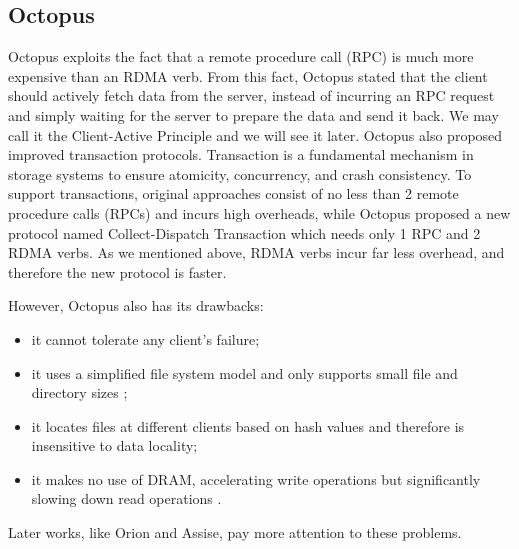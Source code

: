 \begin{survey}
\section{Octopus}
Octopus exploits the fact that a remote procedure call (RPC) is much more expensive than an RDMA verb. From this fact, Octopus stated that the client should actively fetch data from the server, instead of incurring an RPC request and simply waiting for the server to prepare the data and send it back. We may call it the Client-Active Principle and we will see it later. Octopus also proposed improved transaction protocols. Transaction is a fundamental mechanism in storage systems to ensure atomicity, concurrency, and crash consistency. To support transactions, original approaches consist of no less than 2 remote procedure calls (RPCs) and incurs high overheads, while Octopus proposed a new protocol named Collect-Dispatch Transaction which needs only 1 RPC and 2 RDMA verbs. As we mentioned above, RDMA verbs incur far less overhead, and therefore the new protocol is faster.

However, Octopus also has its drawbacks:

\begin{itemize}
    \item it cannot tolerate any client’s failure; 
    \item it uses a simplified file system model and only supports small file and directory sizes \cite{sorion2019};
    \item it locates files at different clients based on hash values and therefore is insensitive to data locality;
    \item it makes no use of DRAM, accelerating write operations but significantly slowing down read operations \cite{sassise2019}.
\end{itemize}

Later works, like Orion and Assise, pay more attention to these problems.


\end{survey}
